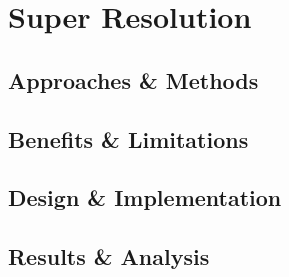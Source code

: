 \chapter{Super Resolution}
\label{chapterlabel5}
\section{Approaches \& Methods}
\section{Benefits \& Limitations}
\section{Design \& Implementation}
\section{Results \& Analysis}
\blindtext
